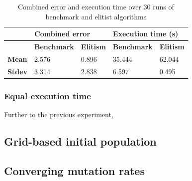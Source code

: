 \documentclass[authoryearcitations]{UoYCSproject}
\begin{document}
\begin{table}[]
\centering
\begin{tabular}{|l|l|l|l|l|}
\hline & \multicolumn{2}{l|}{\textbf{Combined error}} & \multicolumn{2}{l|}{\textbf{Execution time (s)}} \\ \hline & 
\textbf{Benchmark}     & \textbf{Elitism}    & \textbf{Benchmark}       & \textbf{Elitism}      \\ \hline 
\textbf{Mean} & 2.576               & 0.896          & 35.444                 & 62.044              \\ \hline
\textbf{Stdev}  & 3.314               & 2.838            & 6.597                 & 0.495              \\ \hline
\end{tabular}
\caption{Combined error and execution time over 30 runs of benchmark and elitist algorithms}
\label{tab:ga_vs_elite_eq_pop_gen}
\end{table}

\subsubsection{Equal execution time}
\label{subsec:ga_vs_elite_time_sweep}
Further to the previous experiment, 

\subsection{Grid-based initial population}
\label{subsec:grid_based_feature}

\subsection{Converging mutation rates}
\label{subsec:zeno_mutation}



\end{document}
